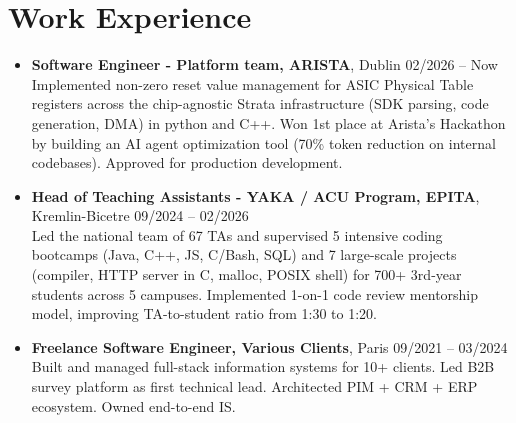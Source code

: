 \documentclass[9pt,a4paper]{article}
\begin{document}
\section*{Work Experience}
\begin{tcolorbox}[mybox]
\begin{itemize}
\item\textbf{Software Engineer - Platform team, ARISTA}, Dublin \hfill {\small02/2026 – Now}\\[0.5em]
\textcolor{gray!40!black}{Implemented non-zero reset value management for ASIC Physical Table registers across the chip-agnostic Strata infrastructure (SDK parsing, code generation, DMA) in python and C++.
Won 1st place at Arista's Hackathon by building an AI agent optimization tool (70\% token reduction on internal codebases). Approved for production development.}

\item\textbf{Head of Teaching Assistants - YAKA / ACU Program, EPITA}, Kremlin-Bicetre \hfill {\small09/2024 – 02/2026}\\[0.5em]
\textcolor{gray!40!black}{Led the national team of 67 TAs and supervised 5 intensive coding bootcamps (Java, C++, JS, C/Bash, SQL) and 7 large-scale projects (compiler, HTTP server in C, malloc, POSIX shell) for 700+ 3rd-year students across 5 campuses. Implemented 1-on-1 code review mentorship model, improving TA-to-student ratio from 1:30 to 1:20.}

\item\textbf{Freelance Software Engineer, Various Clients}, Paris \hfill {\small09/2021 – 03/2024}\\[0.5em]
\textcolor{gray!40!black}{Built and managed full-stack information systems for 10+ clients. Led B2B survey platform as first technical lead. Architected PIM + CRM + ERP ecosystem. Owned end-to-end IS.}
\end{itemize}
\end{tcolorbox}
\end{document}
